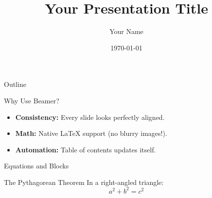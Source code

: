 \documentclass{beamer}
\title{Your Presentation Title}
\author{Your Name}
\institute{Your University/Company}
\date{\today}
\begin{document}
\begin{frame}
    \titlepage
\end{frame}

\begin{frame}{Outline}
    \tableofcontents
\end{frame}

\begin{frame}{Why Use Beamer?}
    \begin{itemize}
        \item \textbf{Consistency:} Every slide looks perfectly aligned.
        \item \textbf{Math:} Native LaTeX support (no blurry images!).
        \item \textbf{Automation:} Table of contents updates itself.
    \end{itemize}
\end{frame}

\begin{frame}{Equations and Blocks}
    \begin{block}{The Pythagorean Theorem}
        In a right-angled triangle:
        $$ a^2 + b^2 = c^2 $$
    \end{block}
\end{frame}
\end{document}
